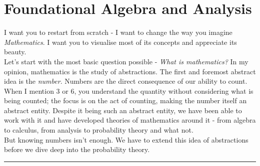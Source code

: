 \chapter{Foundational Algebra and Analysis}

I want you to restart from scratch - I want to change the way you imagine \textit{Mathematics}. I want you to visualise most of its concepts and appreciate its beauty. \\

Let's start with the most basic question possible - \textit{What is mathematics?} In my opinion, mathematics is the study of abstractions. The first and foremost abstract idea is the \textit{number}. Numbers are the direct consequence of our ability to count. When I mention 3 or 6, you understand the quantity without considering what is being counted; the focus is on the act of counting, making the number itself an abstract entity. Despite it being such an abstract entity, we have been able to  work with it and have developed theories of mathematics around it - from algebra to calculus, from analysis to probability theory and what not. \\

But knowing numbers isn't enough. We have to extend this idea of abstractions before we dive deep into the probability theory. 





\vspace{10pt}
\hrule